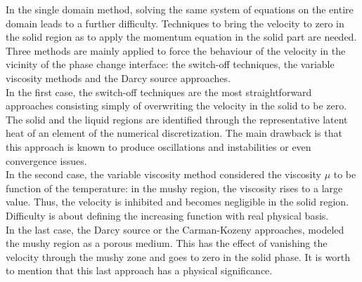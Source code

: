 In the single domain method, solving the same system of equations on the entire domain leads to a further difficulty.
Techniques to bring the velocity to zero in the solid region as to apply the momentum equation in the solid part are needed.
Three methods are mainly applied to force the behaviour of the velocity in the vicinity of the phase change interface:
the switch-off techniques, the variable viscosity methods and the Darcy source approaches.\\
In the first case, the switch-off techniques are the most straightforward approaches consisting simply of overwriting the velocity in the solid to be zero.
The solid and the liquid regions are identified through the representative latent heat of an element of the numerical discretization.
The main drawback is that this approach is known to produce oscillations and instabilities or even convergence issues.\\
In the second case, the variable viscosity method considered the viscosity $\mu$ to be function of the temperature: in the mushy region, the viscosity rises to a large value. 
Thus, the velocity is inhibited and becomes negligible in the solid region.
Difficulty is about defining the increasing function with real physical basis.\\
In the last case, the Darcy source or the Carman-Kozeny approaches, modeled the mushy region as a porous medium. 
This has the effect of vanishing the velocity through the mushy zone and goes to zero in the solid phase. 
It is worth to mention that this last approach has a physical significance.

